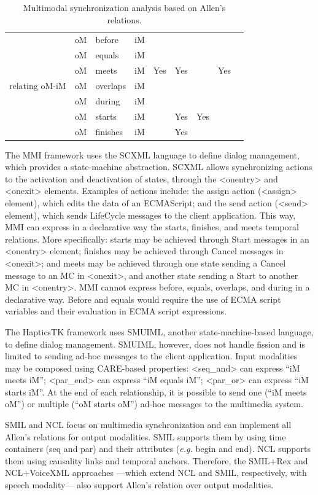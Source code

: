 \documentclass[
  doutorado,
  american
]{ThesisPUC}
\begin{document}
\begin{table}[!ht]
\begin{tabular}{ m{1.8cm} m{0.5cm} m{1cm} m{0.5cm} m{1cm} m{1cm} 
m{1.5cm} m{1.5cm} m{1.5cm}}
	\multirow{7}{*}{relating oM-iM}
	& oM &	before &		iM & & & & & \\
	& oM &	equals &		iM & & & & & \\
	& oM &	meets &			iM & Yes & Yes & & Yes& \\
	& oM &	overlaps &	iM & & & & & \\
	& oM &	during &		iM & & & & & \\
	& oM &	starts &		iM & & Yes & Yes& & \\
	& oM &	finishes &	iM & & Yes & & & \\
	\hline
\end{tabular}
\caption{Multimodal synchronization analysis based on Allen’s relations.}
\label{table:allencomp}
\end{table}

The MMI framework uses the SCXML language to define dialog management, which
provides a state-machine abstraction. SCXML allows synchronizing actions to the
activation and deactivation of states, through the <onentry> and <onexit>
elements. Examples of actions include: the assign action (<assign> element),
which edits the data of an ECMAScript; and the send action (<send> element),
which sends LifeCycle messages to the client application. This way, MMI can
express in a declarative way the starts, finishes, and meets temporal relations.
More specifically: starts may be achieved through Start messages in an <onentry>
element; finishes may be achieved through Cancel messages in <onexit>; and meets
may be achieved through one state sending a Cancel message to an MC in <onexit>,
and another state sending a Start to another MC in <onentry>. MMI cannot express
before, equals, overlaps, and during in a declarative way. Before and equals
would require the use of ECMA script variables and their evaluation in ECMA
script expressions.

The HapticsTK framework uses SMUIML, another state-machine-based language, to
define dialog management. SMUIML, however, does not handle fission and is
limited to sending ad-hoc messages to the client application. Input modalities
may be composed using CARE-based properties: <seq\_and> can express “iM meets
iM”; <par\_end> can express “iM equals iM”; <par\_or> can express “iM starts
iM”. At the end of each relationship, it is possible to send one (“iM meets oM”)
or multiple (“oM starts oM”) ad-hoc messages to the multimedia system. 

SMIL and NCL focus on multimedia synchronization and can implement all Allen’s
relations for output modalities. SMIL supports them by using time containers
(seq and par) and their attributes (\textit{e.g.} begin and end). NCL supports them using
causality links and temporal anchors. Therefore, the SMIL+Rex and NCL+VoiceXML
approaches —which extend NCL and SMIL, respectively, with speech modality— also
support Allen’s relation over output modalities.
\end{document}
